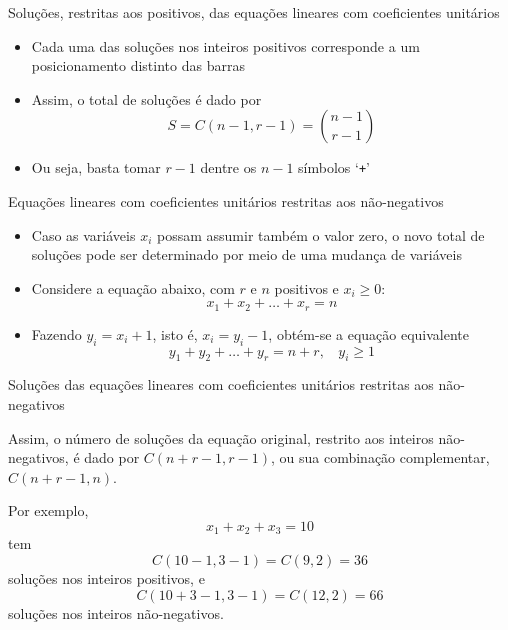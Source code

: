 \begin{frame}[fragile]{Soluções, restritas aos positivos, das equações lineares com coeficientes unitários}

    \begin{itemize}
        \item Cada uma das soluções nos inteiros positivos corresponde a um posicionamento distinto
        das barras

        \item Assim, o total de soluções é dado por 
$$
    S = C(n - 1, r - 1) = \binom{n - 1}{r - 1}
$$

        \item Ou seja, basta tomar $r - 1$ dentre os $n - 1$ símbolos `\texttt{+}'
    \end{itemize}

\end{frame}

\begin{frame}[fragile]{Equações lineares com coeficientes unitários restritas aos não-negativos}

    \begin{itemize}
        \item Caso as variáveis $x_i$ possam assumir também o valor zero, o novo total de soluções
            pode ser determinado por meio de uma mudança de variáveis

        \item Considere a equação abaixo, com $r$ e $n$ positivos e $x_i\geq 0$:
$$
        x_1 + x_2 + \ldots + x_r = n
$$
        \item Fazendo $y_i = x_i + 1$, isto é, $x_i = y_i - 1$, obtém-se a equação equivalente
$$
        y_1 + y_2 + \ldots + y_r = n + r, \ \ \ \ y_i\geq 1
$$
    \end{itemize}

\end{frame}

\begin{frame}[fragile]{Soluções das equações lineares com coeficientes unitários restritas aos não-negativos}

Assim, o número de soluções da equação original, restrito aos inteiros não-negativos, é dado por $C(n + r - 1, r - 1)$, ou sua combinação complementar, $C(n + r - 1, n)$.

\vspace{0.1in}

Por exemplo,
$$
        x_1 + x_2 + x_3 = 10
$$
tem
$$C(10 - 1, 3 - 1) = C(9, 2) = 36$$
soluções nos inteiros positivos, e
$$C(10 + 3 - 1, 3 - 1) = C(12, 2) = 66$$
soluções nos inteiros não-negativos.

\end{frame}

